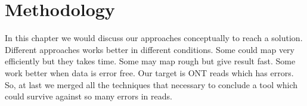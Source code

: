 \documentclass{standalone}
\begin{document}
\chapter{Methodology}
In this chapter we would discuss our approaches conceptually to reach a solution. Different approaches works better in different conditions. Some could map very efficiently but they takes time. Some may map rough but give result fast. Some work better when data is error free. Our target is ONT reads which has errors. So, at last we merged all the techniques that necessary to conclude a tool which could survive against so many errors in reads.
\end{document}
